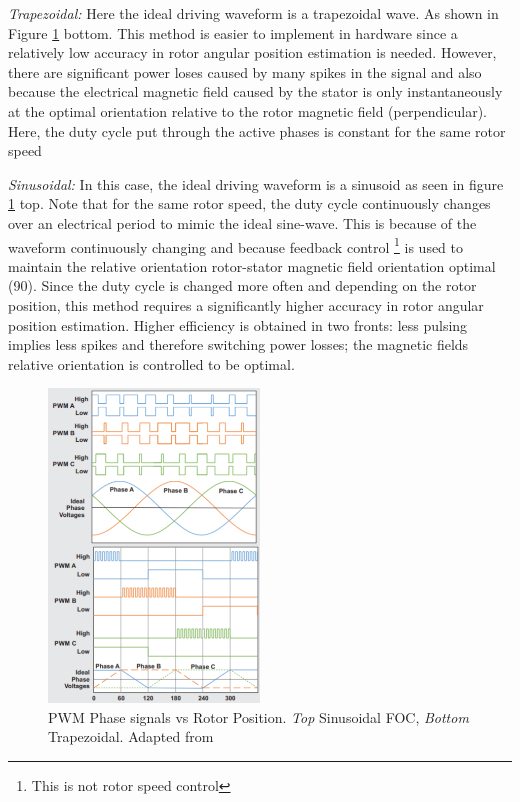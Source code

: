 \textit{Trapezoidal:}
Here the ideal driving waveform is a trapezoidal wave. As shown in Figure \ref{fig:foc_trapezoidal_signals} bottom. This method is easier to implement in hardware since a relatively low accuracy in rotor angular position estimation is needed. However, there are significant power loses caused by many spikes in the signal and also because the electrical magnetic field caused by the stator is only instantaneously at the optimal orientation relative to the rotor magnetic field (perpendicular). Here, the duty cycle put through the active phases is constant for the same rotor speed
\newline

\textit{Sinusoidal:}
In this case, the ideal driving waveform is a sinusoid as seen in figure \ref{fig:foc_trapezoidal_signals} top. Note that for the same rotor speed, the duty cycle continuously changes over an electrical period to mimic the ideal sine-wave. This is because of the waveform continuously changing and because feedback control \footnote{This is not rotor speed control} is used to maintain the relative orientation rotor-stator magnetic field orientation optimal (90\textdegree). Since the duty cycle is changed more often and depending on the rotor position, this method requires a significantly higher accuracy in rotor angular position estimation.
Higher efficiency is obtained in two fronts: less pulsing implies less spikes and therefore switching power losses; the magnetic fields relative orientation is controlled to be optimal. 

\begin{figure}
    \centering
    \includegraphics[width=0.5\textwidth]{images/foc_trap_sig.png}
    \caption{PWM Phase signals vs Rotor Position. \textit{Top} Sinusoidal FOC, \textit{Bottom} Trapezoidal. Adapted from \cite{Mogensen_ESC_Motor_Control2016}}
    \label{fig:foc_trapezoidal_signals}
\end{figure}


